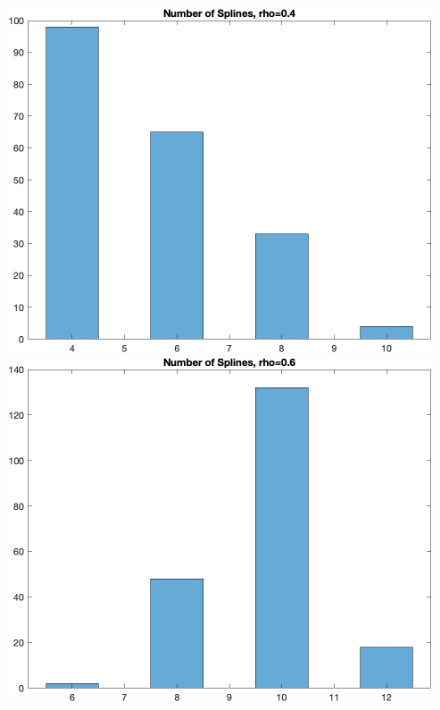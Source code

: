 \documentclass[
]{article}
\begin{document}
\begin{figure}
\begin{minipage}{0.50\linewidth}
\includegraphics{../figures/hist_n_spli_rho-0.4_quadratic_splines.png}\end{minipage}%
%
\begin{minipage}{0.50\linewidth}
\includegraphics{../figures/hist_n_spli_rho-0.6_quadratic_splines.png}\end{minipage}%
\newline
\begin{minipage}{0.50\linewidth}

\end{minipage}
\end{figure}
\end{document}
